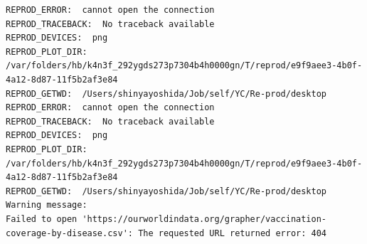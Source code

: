 \documentclass[
  11pt,
]{article}
\newenvironment{Shaded}{\begin{snugshade}}{\end{snugshade}}
\newcommand{\AttributeTok}[1]{\textcolor[rgb]{0.13,0.29,0.53}{#1}}
\newcommand{\CommentTok}[1]{\textcolor[rgb]{0.56,0.35,0.01}{\textit{#1}}}
\newcommand{\DecValTok}[1]{\textcolor[rgb]{0.00,0.00,0.81}{#1}}
\newcommand{\FunctionTok}[1]{\textcolor[rgb]{0.13,0.29,0.53}{\textbf{#1}}}
\newcommand{\NormalTok}[1]{#1}
\newcommand{\SpecialCharTok}[1]{\textcolor[rgb]{0.81,0.36,0.00}{\textbf{#1}}}
\newcommand{\StringTok}[1]{\textcolor[rgb]{0.31,0.60,0.02}{#1}}
\newenvironment{rpoutput}{\vspace{0.5em}\begin{snugshade}}{\end{snugshade}}
\begin{document}
\begin{Shaded}
\end{Shaded}

\begin{rpoutput}

\begin{verbatim}
REPROD_ERROR:  cannot open the connection 
REPROD_TRACEBACK:  No traceback available  
REPROD_DEVICES:  png 
REPROD_PLOT_DIR:  /var/folders/hb/k4n3f_292ygds273p7304b4h0000gn/T/reprod/e9f9aee3-4b0f-4a12-8d87-11f5b2af3e84 
REPROD_GETWD:  /Users/shinyayoshida/Job/self/YC/Re-prod/desktop 
REPROD_ERROR:  cannot open the connection 
REPROD_TRACEBACK:  No traceback available  
REPROD_DEVICES:  png 
REPROD_PLOT_DIR:  /var/folders/hb/k4n3f_292ygds273p7304b4h0000gn/T/reprod/e9f9aee3-4b0f-4a12-8d87-11f5b2af3e84 
REPROD_GETWD:  /Users/shinyayoshida/Job/self/YC/Re-prod/desktop 
Warning message:
Failed to open 'https://ourworldindata.org/grapher/vaccination-coverage-by-disease.csv': The requested URL returned error: 404 
\end{verbatim}

\end{rpoutput}
\end{document}
